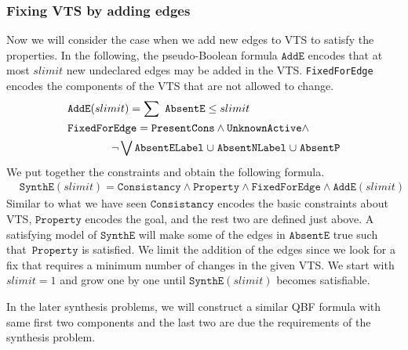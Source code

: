 \subsubsection{Fixing VTS by adding edges}
%
Now we will consider the case when we add new edges to VTS to satisfy the properties.
%
In the following, the pseudo-Boolean formula $\texttt{AddE}$ encodes
that at most $slimit$ new undeclared edges may be added in the VTS.
%
\texttt{FixedForEdge} encodes the components of the VTS that are not allowed to change.
\begin{align*}
&\texttt{AddE}(slimit) = \sum~\texttt{AbsentE} \leq slimit\\
&\texttt{FixedForEdge} = \texttt{PresentCons} \land \texttt{UnknownActive} \land\\
& \quad\quad\quad\quad \lnot \bigvee \texttt{AbsentELabel} \;{\cup}\;
\texttt{AbsentNLabel} \;{\cup}\;
\texttt{AbsentP}
\end{align*}
We put together the constraints and obtain the following formula.
\begin{align*}
& \texttt{SynthE}(slimit) =
\texttt{Consistancy}\land \texttt{Property} \land
\texttt{FixedForEdge} \land
\texttt{AddE}(slimit)
\end{align*}
Similar to what we have seen $\texttt{Consistancy}$ encodes the basic constraints about VTS,
$\texttt{Property}$\; encodes the goal, and
the rest two are defined just above.
%
A satisfying model of $\texttt{SynthE}$ will make 
some of the edges in $\texttt{AbsentE}$ true such that~$\texttt{Property}$ is satisfied.
%
We limit the addition of the edges since we look for a fix that requires a minimum number
of changes in the given VTS.
%
We start with $slimit = 1$ and grow one by one until $\texttt{SynthE}(slimit)$
becomes satisfiable.

In the later synthesis problems, we will construct a similar QBF
formula with same first two components and the last two are due the
requirements of the synthesis problem.
%
